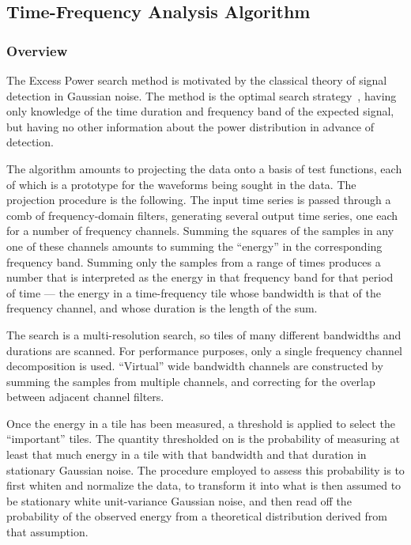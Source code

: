 \documentclass[10pt]{article}
\begin{document}
\subsection{Time-Frequency Analysis Algorithm}


\subsubsection{Overview}


The Excess Power search method is motivated by the classical theory of
signal detection in Gaussian noise.  The method is the optimal search
strategy~\cite{anderson2001}, having only knowledge of the time duration
and frequency band of the expected signal,  but having no other information
about the power distribution in advance of detection.

The algorithm amounts to projecting the data onto a basis of test
functions, each of which is a prototype for the waveforms being sought in
the data.  The projection procedure is the following.  The input time
series is passed through a comb of frequency-domain filters, generating
several output time series, one each for a number of frequency channels.
Summing the squares of the samples in any one of these channels amounts to
summing the ``energy'' in the corresponding frequency band.  Summing only
the samples from a range of times produces a number that is interpreted as
the energy in that frequency band for that period of time --- the energy in
a time-frequency tile whose bandwidth is that of the frequency channel, and
whose duration is the length of the sum.

The search is a multi-resolution search, so tiles of many different
bandwidths and durations are scanned.  For performance purposes, only a
single frequency channel decomposition is used.  ``Virtual'' wide bandwidth
channels are constructed by summing the samples from multiple channels, and
correcting for the overlap between adjacent channel filters.

Once the energy in a tile has been measured, a threshold is applied to
select the ``important'' tiles.  The quantity thresholded on is the
probability of measuring at least that much energy in a tile with that
bandwidth and that duration in stationary Gaussian noise.  The procedure
employed to assess this probability is to first whiten and normalize the
data, to transform it into what is then assumed to be stationary white
unit-variance Gaussian noise, and then read off the probability of the
observed energy from a theoretical distribution derived from that
assumption.
\end{document}
